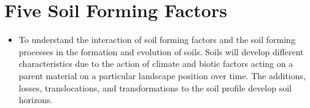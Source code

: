 \documentclass[
  letterpaper,
  twocolumn,
  portrait]{scrbook}
\providecommand{\tightlist}{%
  \setlength{\itemsep}{0pt}\setlength{\parskip}{0pt}}\usepackage{longtable,booktabs,array}
\begin{document}

\hypertarget{five-soil-forming-factors}{%
\chapter{\texorpdfstring{\textbf{Five Soil Forming
Factors}}{Five Soil Forming Factors}}\label{five-soil-forming-factors}}

\begin{tcolorbox}[enhanced jigsaw, colframe=quarto-callout-note-color-frame, coltitle=black, arc=.35mm, breakable, bottomrule=.15mm, colback=white, rightrule=.15mm, toprule=.15mm, opacityback=0, bottomtitle=1mm, left=2mm, titlerule=0mm, leftrule=.75mm, opacitybacktitle=0.6, toptitle=1mm, title=\textcolor{quarto-callout-note-color}{\faInfo}\hspace{0.5em}{Objectives}, colbacktitle=quarto-callout-note-color!10!white]

\begin{itemize}
\tightlist
\item
  To understand the interaction of soil forming factors and the soil
  forming processes in the formation and evolution of soils. Soils will
  develop different characteristics due to the action of climate and
  biotic factors acting on a parent material on a particular landscape
  position over time. The additions, losses, translocations, and
  transformations to the soil profile develop soil horizons.
\end{itemize}

\end{tcolorbox}
\end{document}
